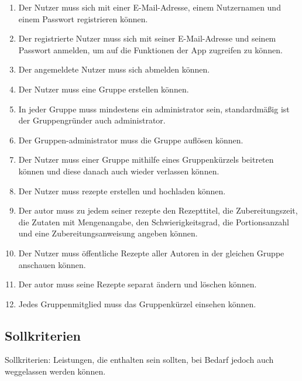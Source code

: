 \documentclass[parskip=full]{scrartcl}
\begin{document}
\begin{enumerate}[start=1,label={$\langle$\bfseries RM\arabic*$\rangle$}, leftmargin = 5em, itemsep=4pt, parsep=4pt]
    \item Der Nutzer muss sich mit einer E-Mail-Adresse, einem Nutzernamen und einem Passwort registrieren können.\label{rm:Registering}
    \item Der registrierte Nutzer muss sich mit seiner E-Mail-Adresse und seinem Passwort anmelden, um auf die Funktionen der App zugreifen zu können. \label{rm:Login}
    \item Der angemeldete Nutzer muss sich abmelden können. \label{rm:Logout}
    \item Der Nutzer muss eine Gruppe erstellen können. \label{rm:GroupCreation}
    \item In jeder Gruppe muss mindestens ein \Gls{administrator} sein, standardmäßig ist der Gruppengründer auch \Gls{administrator}.\label{rm:GroupAdmin}
    \item Der Gruppen-\Gls{administrator} muss die Gruppe auflösen können. \label{rm:GroupDeletion}
    \item Der Nutzer muss einer Gruppe mithilfe eines Gruppenkürzels beitreten können und diese danach auch wieder verlassen können.\label{rm:GroupJoining}
    \item Der Nutzer muss \Gls{rezept}e erstellen und hochladen können. \label{rm:RecipeCreation}
    \item Der \Gls{autor} muss zu jedem seiner \Gls{rezept}e den Rezepttitel, die Zubereitungszeit, die Zutaten mit Mengenangabe, den Schwierigkeitsgrad, die Portionsanzahl und eine Zubereitungsanweisung angeben können.\label{rm:RecipeContents}
    \item Der Nutzer muss öffentliche Rezepte aller Autoren in der gleichen Gruppe anschauen können.\label{rm:RecipeViewing}
    \item Der \Gls{autor} muss seine Rezepte separat ändern und löschen können.\label{rm:RecipeManagement}
    \item Jedes Gruppenmitglied muss das Gruppenkürzel einsehen können.\label{rm:GroupId}
\end{enumerate}

\subsection{Sollkriterien}
Sollkriterien: Leistungen, die enthalten sein sollten, bei Bedarf jedoch auch weggelassen werden können.
\end{document}
